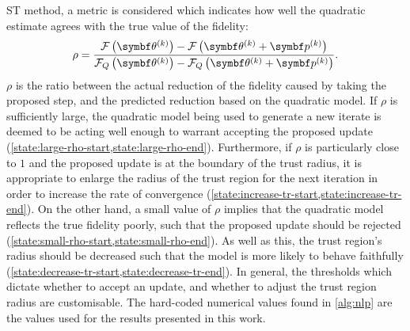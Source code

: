 \ac{ST} method, a metric is considered which indicates how well the
quadratic estimate agrees with the true value of the fidelity:
\begin{equation}
    \rho = \frac
        {\Fthk - \Fthkpk}
        {\FQthk - \FQthkpk}.
\end{equation}
$\rho$ is the ratio between the actual reduction of the fidelity caused
by taking the proposed step, and the predicted reduction based on the quadratic
model. If $\rho$ is sufficiently large, the quadratic model being
used to generate a new iterate is deemed to be acting well enough to warrant
accepting the proposed update
(\cref{state:large-rho-start,state:large-rho-end}).
Furthermore, if $\rho$ is particularly close to $1$ and the proposed
update is at the boundary of the trust radius, it is appropriate to enlarge the
radius of the trust region for the next iteration in order to increase the
rate of convergence
(\cref{state:increase-tr-start,state:increase-tr-end}).
On the other hand, a small value of $\rho$ implies that the
quadratic model reflects the true fidelity poorly, such that the proposed
update should be rejected
(\cref{state:small-rho-start,state:small-rho-end}).
As well as this, the trust region's radius should be
decreased such that the model is more likely to behave faithfully
(\cref{state:decrease-tr-start,state:decrease-tr-end}). In general, the
thresholds which dictate whether to accept an update, and whether to adjust the
trust region radius are customisable. The hard-coded numerical values found in
\cref{alg:nlp} are the values used for the results presented in this work.

